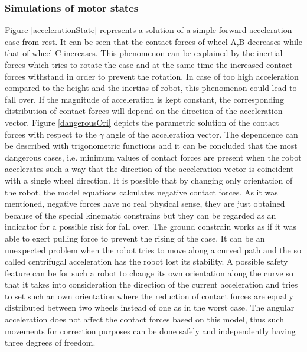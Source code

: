 \documentclass[12pt,english,twoside]{article}
\begin{document}
\subsubsection{Simulations of motor states}
Figure \ref{accelerationState} represents a solution of a simple forward acceleration case from rest. It can be seen that the contact forces of wheel A,B decreases while that of wheel C increases. This phenomenon can be explained by the inertial forces which tries to rotate the case and at the same time the increased contact forces withstand in order to prevent the rotation. In case of too high acceleration compared to the height and the inertias of robot, this phenomenon could lead to fall over. 
If the magnitude of acceleration is kept constant, the corresponding distribution of contact forces will depend on the direction of the acceleration vector.
Figure \ref{dangerousOri} depicts the parametric solution of the contact forces with respect to the $\gamma$ angle of the acceleration vector. The dependence can be described with trigonometric functions and it can be concluded that the most dangerous cases, i.e. minimum values of contact forces are present when the robot accelerates such a way that the direction of the acceleration vector is coincident with a single wheel direction. It is possible that by changing only orientation of the robot, the model equations calculates negative contact forces. As it was mentioned, negative forces have no real physical sense, they are just obtained because of the special kinematic constrains but they can be regarded as an indicator for a possible risk for fall over. The ground constrain works as if it was able to exert pulling force to prevent the rising of the case. It can be an unexpected problem when the robot tries to move along a curved path and the so called centrifugal acceleration has the robot lost its stability. A possible safety feature can be for such a robot to change its own orientation along the curve so that it takes into consideration the direction of the current acceleration and tries to set such an own orientation where the reduction of contact forces are equally distributed between two wheels instead of one as in the worst case. The angular acceleration does not affect the contact forces based on this model, thus such movements for correction purposes can be done safely and independently having three degrees of freedom.
\end{document}
